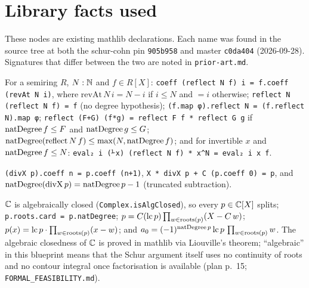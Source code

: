 \chapter{Library facts used}

These nodes are existing mathlib declarations. Each name was found in the
source tree at both the schur-cohn pin \texttt{905b958} and master
\texttt{c0da404} (2026-09-28). Signatures that differ between the two are
noted in \texttt{prior-art.md}.

\begin{lemma}\label{ml:reflect}
\mathlibok
For a semiring $R$, $N:\mathbb{N}$ and $f\in R[X]$:
\texttt{coeff (reflect N f) i = f.coeff (revAt N i)}, where
$\mathrm{revAt}\,N\,i = N-i$ if $i\le N$ and $=i$ otherwise;
\texttt{reflect N (reflect N f) = f} (no degree hypothesis);
\texttt{(f.map φ).reflect N = (f.reflect N).map φ};
\texttt{reflect (F+G) (f*g) = reflect F f * reflect G g} if
$\mathrm{natDegree}\,f\le F$ and $\mathrm{natDegree}\,g\le G$;
$\mathrm{natDegree}(\mathrm{reflect}\,N\,f)\le\max(N,\mathrm{natDegree}\,f)$; and for invertible $x$
and $\mathrm{natDegree}\,f\le N$:
\texttt{eval₂ i (⅟x) (reflect N f) * x\^{}N = eval₂ i x f}.
\end{lemma}

\begin{lemma}[division by $X$]\label{ml:divX}
\mathlibok
\texttt{(divX p).coeff n = p.coeff (n+1)}, \texttt{X * divX p + C (p.coeff 0) = p},
and $\mathrm{natDegree}(\mathrm{divX}\,p)=\mathrm{natDegree}\,p-1$ (truncated subtraction).
\end{lemma}

\begin{lemma}\label{ml:splits}
\mathlibok
$\mathbb{C}$ is algebraically closed (\texttt{Complex.isAlgClosed}), so every
$p\in\mathbb{C}[X]$ splits; \texttt{p.roots.card = p.natDegree};
$p = C(\mathrm{lc}\,p)\prod_{w\in\mathrm{roots}(p)}(X-C\,w)$;
$p(x)=\mathrm{lc}\,p\cdot\prod_{w\in\mathrm{roots}(p)}(x-w)$; and
$a_0 = (-1)^{\mathrm{natDegree}\,p}\,\mathrm{lc}\,p\,\prod_{w\in\mathrm{roots}(p)} w$.
The algebraic closedness of $\mathbb{C}$ is proved in mathlib via Liouville's theorem;
``algebraic'' in this blueprint means that the Schur argument itself uses no
continuity of roots and no contour integral once factorisation is available
(plan p.~15; \texttt{FORMAL\_FEASIBILITY.md}).
\end{lemma}

